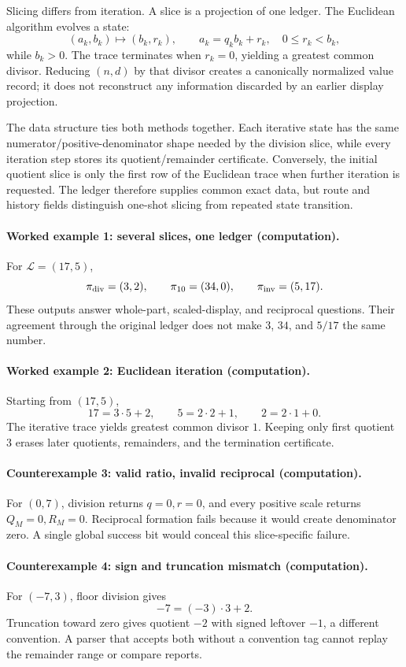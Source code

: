 Slicing differs from iteration.  A slice is a projection of one ledger.  The Euclidean algorithm evolves a state:
\[
(a_k,b_k)\longmapsto(b_k,r_k),\qquad
a_k=q_kb_k+r_k,\quad0\leq r_k<b_k,
\]
while \(b_k>0\).  The trace terminates when \(r_k=0\), yielding a greatest common divisor.  Reducing
\((n,d)\) by that divisor creates a canonically normalized value record; it does not reconstruct any information
discarded by an earlier display projection.

The data structure ties both methods together.  Each iterative state has the same numerator/positive-denominator
shape needed by the division slice, while every iteration step stores its quotient/remainder certificate.  Conversely,
the initial quotient slice is only the first row of the Euclidean trace when further iteration is requested.  The
ledger therefore supplies common exact data, but route and history fields distinguish one-shot slicing from repeated
state transition.

\paragraph{Worked example 1: several slices, one ledger (computation).}
For \(\mathcal L=(17,5)\),
\[
\pi_{\rm div}=(3,2),\qquad
\pi_{10}=(34,0),\qquad
\pi_{\rm inv}=(5,17).
\]
These outputs answer whole-part, scaled-display, and reciprocal questions.  Their agreement through the original
ledger does not make \(3\), \(34\), and \(5/17\) the same number.

\paragraph{Worked example 2: Euclidean iteration (computation).}
Starting from \((17,5)\),
\[
17=3\cdot5+2,\qquad5=2\cdot2+1,\qquad2=2\cdot1+0.
\]
The iterative trace yields greatest common divisor \(1\).  Keeping only first quotient \(3\) erases later quotients,
remainders, and the termination certificate.

\paragraph{Counterexample 3: valid ratio, invalid reciprocal (computation).}
For \((0,7)\), division returns \(q=0,r=0\), and every positive scale returns \(Q_M=0,R_M=0\).  Reciprocal formation
fails because it would create denominator zero.  A single global success bit would conceal this slice-specific
failure.

\paragraph{Counterexample 4: sign and truncation mismatch (computation).}
For \((-7,3)\), floor division gives
\[
                         -7=(-3)\cdot3+2.
\]
Truncation toward zero gives quotient \(-2\) with signed leftover \(-1\), a different convention.  A parser that
accepts both without a convention tag cannot replay the remainder range or compare reports.

